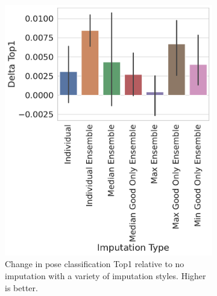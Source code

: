 \documentclass[journal=jcisd8,manuscript=article]{achemso}
\begin{document}
\begin{figure}[tbph]
\begin{subfigure}[t]{0.30\textwidth}
        \includegraphics[width=\linewidth]{figures/ComparingImpStylesTop1.pdf}
        \caption{Change in pose classification Top1 relative to no imputation with a variety of imputation styles. Higher is better.}
    \end{subfigure}
    \hfill
    \begin{subfigure}[t]{0.30\textwidth}
        \centering

\end{subfigure}
\end{figure}
\end{document}
